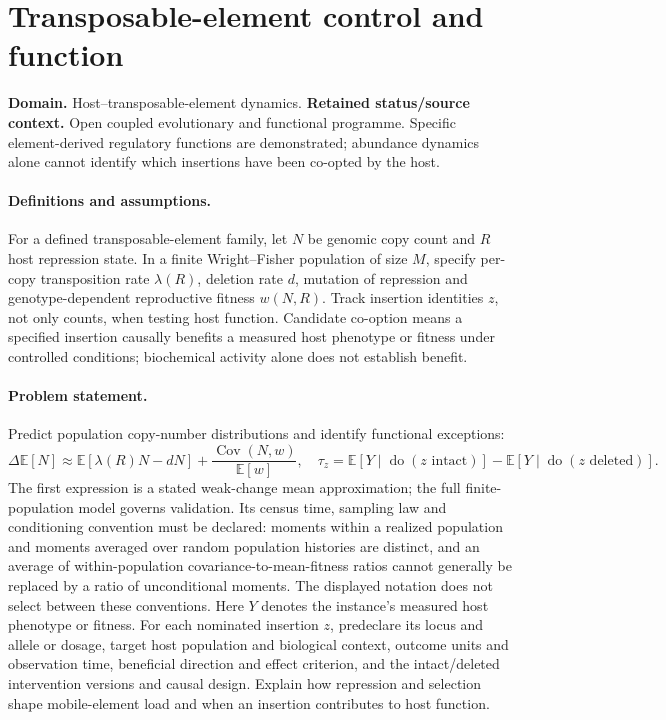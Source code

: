 \documentclass[11pt]{article}
\begin{document}
\section*{Transposable-element control and function}
\label{prob:038}
\label{rank:124}
\par\smallskip

\noindent\textbf{Domain.} Host--transposable-element dynamics. \quad \textbf{Retained status/source context.} Open coupled evolutionary and functional programme. Specific element-derived regulatory functions are demonstrated; abundance dynamics alone cannot identify which insertions have been co-opted by the host.
\paragraph{Definitions and assumptions.} For a defined transposable-element family, let $N$ be genomic copy count and $R$ host repression state. In a finite Wright--Fisher population of size $M$, specify per-copy transposition rate $\lambda(R)$, deletion rate $d$, mutation of repression and genotype-dependent reproductive fitness $w(N,R)$. Track insertion identities $z$, not only counts, when testing host function. Candidate co-option means a specified insertion causally benefits a measured host phenotype or fitness under controlled conditions; biochemical activity alone does not establish benefit.
\paragraph{Problem statement.} Predict population copy-number distributions and identify functional exceptions:
\[
\Delta\mathbb{E}[N]\approx\mathbb{E}[\lambda(R)N-dN]+\frac{\operatorname{Cov}(N,w)}{\mathbb{E}[w]},
\quad \tau_z=\mathbb{E}[Y\mid\operatorname{do}(z\text{ intact})]-\mathbb{E}[Y\mid\operatorname{do}(z\text{ deleted})].
\]
The first expression is a stated weak-change mean approximation; the full finite-population model governs validation. Its census time, sampling law and conditioning convention must be declared: moments within a realized population and moments averaged over random population histories are distinct, and an average of within-population covariance-to-mean-fitness ratios cannot generally be replaced by a ratio of unconditional moments. The displayed notation does not select between these conventions. Here $Y$ denotes the instance's measured host phenotype or fitness. For each nominated insertion $z$, predeclare its locus and allele or dosage, target host population and biological context, outcome units and observation time, beneficial direction and effect criterion, and the intact/deleted intervention versions and causal design. Explain how repression and selection shape mobile-element load and when an insertion contributes to host function.
\end{document}
